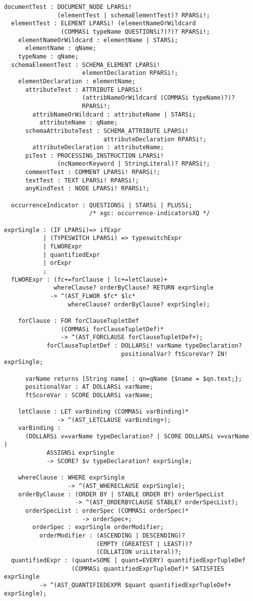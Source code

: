 \begin{verbatim}
documentTest : DOCUMENT_NODE LPARSi! 
               (elementTest | schemaElementTest)? RPARSi!;
  elementTest : ELEMENT LPARSi! (elementNameOrWildcard 
                (COMMASi typeName QUESTIONSi?)?)? RPARSi!;
    elementNameOrWildcard : elementName | STARSi;
      elementName : qName;
    typeName : qName;
  schemaElementTest : SCHEMA_ELEMENT LPARSi! 
                      elementDeclaration RPARSi!;
    elementDeclaration : elementName;
      attributeTest : ATTRIBUTE LPARSi! 
                      (attribNameOrWildcard (COMMASi typeName)?)? 
                      RPARSi!;
        attribNameOrWildcard : attributeName | STARSi;
          attributeName : qName;
      schemaAttributeTest : SCHEMA_ATTRIBUTE LPARSi! 
                            attributeDeclaration RPARSi!;
        attributeDeclaration : attributeName;
      piTest : PROCESSING_INSTRUCTION LPARSi! 
               (ncNameorKeyword | StringLiteral)? RPARSi!;
      commentTest : COMMENT LPARSi! RPARSi!;
      textTest : TEXT LPARSi! RPARSi!;
      anyKindTest : NODE LPARSi! RPARSi!;

  occurrenceIndicator : QUESTIONSi | STARSi | PLUSSi; 
                        /* xgc: occurrence-indicatorsXQ */

exprSingle : (IF LPARSi)=> ifExpr
           | (TYPESWITCH LPARSi) => typeswitchExpr
           | fLWORExpr
           | quantifiedExpr
           | orExpr
           ;
  fLWORExpr : (fc+=forClause | lc+=letClause)+ 
              whereClause? orderByClause? RETURN exprSingle
             -> ^(AST_FLWOR $fc* $lc* 
                  whereClause? orderByClause? exprSingle);

    forClause : FOR forClauseTupletDef 
                (COMMASi forClauseTupletDef)*
                -> ^(AST_FORCLAUSE forClauseTupletDef+);
            forClauseTupletDef : DOLLARSi! varName typeDeclaration? 
                                 positionalVar? ftScoreVar? IN! exprSingle;

      varName returns [String name] : qn=qName {$name = $qn.text;};
      positionalVar : AT DOLLARSi varName;
      ftScoreVar : SCORE DOLLARSi varName;

    letClause : LET varBinding (COMMASi varBinding)*
               -> ^(AST_LETCLAUSE varBinding+);
    varBinding :
      (DOLLARSi v=varName typeDeclaration? | SCORE DOLLARSi v=varName )
            ASSIGNSi exprSingle
            -> SCORE? $v typeDeclaration? exprSingle;

    whereClause : WHERE exprSingle
                  -> ^(AST_WHERECLAUSE exprSingle);
    orderByClause : (ORDER BY | STABLE ORDER BY) orderSpecList
                    -> ^(AST_ORDERBYCLAUSE STABLE? orderSpecList);
      orderSpecList : orderSpec (COMMASi orderSpec)*
                      -> orderSpec+;
        orderSpec : exprSingle orderModifier;
          orderModifier : (ASCENDING | DESCENDING)? 
                          (EMPTY (GREATEST | LEAST))? 
                          (COLLATION uriLiteral)?;
  quantifiedExpr : (quant=SOME | quant=EVERY) quantifiedExprTupleDef
                   (COMMASi quantifiedExprTupleDef)* SATISFIES exprSingle
          -> ^(AST_QUANTIFIEDEXPR $quant quantifiedExprTupleDef+ exprSingle);


\end{verbatim}
